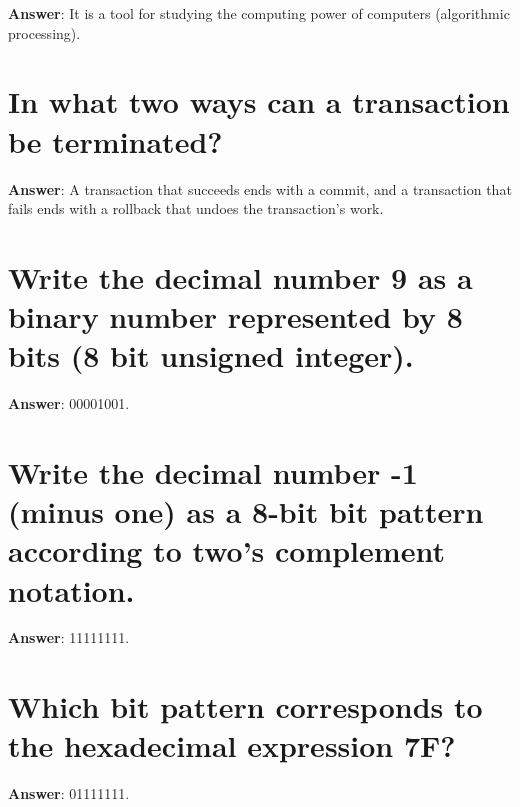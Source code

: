 \documentclass[a4paper,11pt,oneside]{book}
\begin{document}
\begin{sloppypar}
\label{q:345:sa:en:True}

\textbf{Answer}: It is a tool for studying the computing power of computers (algorithmic processing).



\section{In what two ways can a transaction be terminated?}

\label{q:346:sa:en:True}

\textbf{Answer}: A transaction that succeeds ends with a commit, and a transaction that fails ends with a rollback that undoes the transaction's work.





















\section{Write the decimal number 9 as a binary number represented by 8 bits (8 bit unsigned integer).}

\label{q:357:sa:en:True}

\textbf{Answer}: 00001001.



\section{Write the decimal number -1 (minus one) as a 8-bit bit pattern according to two{\textquoteright}s complement notation.}

\label{q:358:sa:en:True}

\textbf{Answer}: 11111111.



\section{Which bit pattern corresponds to the hexadecimal expression 7F?}

\label{q:359:sa:en:True}

\textbf{Answer}: 01111111.




\end{sloppypar}
\end{document}
